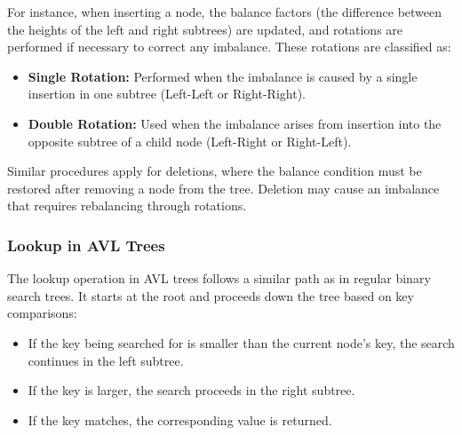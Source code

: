 For instance, when inserting a node, the balance factors (the difference between the heights of the left and right subtrees) are updated, and rotations are performed if necessary to correct any imbalance. These rotations are classified as:
\begin{itemize}
	\item \textbf{Single Rotation:} Performed when the imbalance is caused by a single insertion in one subtree (Left-Left or Right-Right).
	\item \textbf{Double Rotation:} Used when the imbalance arises from insertion into the opposite subtree of a child node (Left-Right or Right-Left).
\end{itemize}
Similar procedures apply for deletions, where the balance condition must be restored after removing a node from the tree. Deletion may cause an imbalance that requires rebalancing through rotations.

\subsubsection{Lookup in AVL Trees}
The lookup operation in AVL trees follows a similar path as in regular binary search trees. It starts at the root and proceeds down the tree based on key comparisons:
\begin{itemize}
    \item If the key being searched for is smaller than the current node's key, the search continues in the left subtree.
    \item If the key is larger, the search proceeds in the right subtree.
    \item If the key matches, the corresponding value is returned.
\end{itemize}



